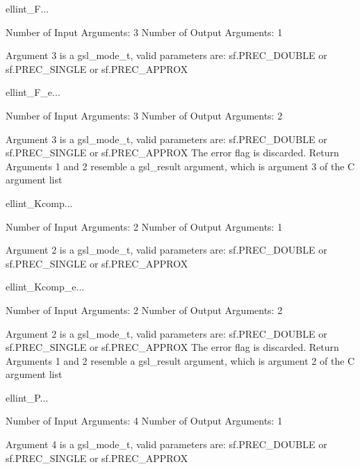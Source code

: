 \begin{funcdesc}{ellint_F}{...}

    Number of Input  Arguments:  3
    Number of Output Arguments:  1

 Argument 3 is a gsl_mode_t, valid parameters are:
	sf.PREC_DOUBLE or sf.PREC_SINGLE or sf.PREC_APPROX

\end{funcdesc}

\begin{funcdesc}{ellint_F_e}{...}

    Number of Input  Arguments:  3
    Number of Output Arguments:  2

 Argument 3 is a gsl_mode_t, valid parameters are:
	sf.PREC_DOUBLE or sf.PREC_SINGLE or sf.PREC_APPROX
The error flag is discarded.
Return Arguments 1 and 2 resemble a gsl_result argument,
	which is  argument 3 of the C argument list

\end{funcdesc}

\begin{funcdesc}{ellint_Kcomp}{...}

    Number of Input  Arguments:  2
    Number of Output Arguments:  1

 Argument 2 is a gsl_mode_t, valid parameters are:
	sf.PREC_DOUBLE or sf.PREC_SINGLE or sf.PREC_APPROX

\end{funcdesc}

\begin{funcdesc}{ellint_Kcomp_e}{...}

    Number of Input  Arguments:  2
    Number of Output Arguments:  2

 Argument 2 is a gsl_mode_t, valid parameters are:
	sf.PREC_DOUBLE or sf.PREC_SINGLE or sf.PREC_APPROX
The error flag is discarded.
Return Arguments 1 and 2 resemble a gsl_result argument,
	which is  argument 2 of the C argument list

\end{funcdesc}

\begin{funcdesc}{ellint_P}{...}

    Number of Input  Arguments:  4
    Number of Output Arguments:  1

 Argument 4 is a gsl_mode_t, valid parameters are:
	sf.PREC_DOUBLE or sf.PREC_SINGLE or sf.PREC_APPROX

\end{funcdesc}


